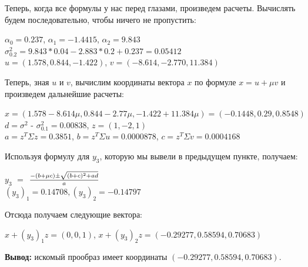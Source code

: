 \documentclass[12pt,a4 paper]{book}
\begin{document}
\begin{enumerate}
Теперь, когда все формулы у нас перед глазами, произведем расчеты. Вычислять будем последовательно, чтобы ничего не пропустить:
\begin{center}
$\alpha_0 = 0.237$, $\alpha_1 = -1.4415$, $\alpha_2 = 9.843$ \\
$\sigma^2_{0.2} = 9.843*0.04-2.883*0.2+0.237 = 0.05412$ \\
$u = (1.578, 0.844, -1.422)$, $v = (-8.614, -2.770, 11.384)$
\end{center}
Теперь, зная $u$ и $v$, вычислим координаты вектора $x$ по формуле $x = u+\mu v$ и произведем дальнейшие расчеты:
\begin{center}
$x = (1.578-8.614\mu,0.844-2.77\mu,-1.422+11.384\mu) = (-0.1448, 0.29, 0.8548)$ \\
\smallskip
$d = \sigma^2 $ - $ \sigma^2_{0.1} = 0.00838$, $z = (1, -2, 1)$\\
\smallskip
$a = z^T\Sigma z = 0.3851$, $b = z^T\Sigma u = 0.0000878$, $c = z^T\Sigma v = 0.0004168$ 
\end{center}
Используя формулу для $y_3$, которую мы вывели в предыдущем пункте, получаем:
\begin{center}
$y_3$ $=$ ${-(b+\mu c)\pm\sqrt{(b+c)^2+ad}}\over{a}$\\
\smallskip
$(y_3)_1 = 0.14708, (y_3)_2 = -0.14797$ \\
\end{center}
Отсюда получаем следующие вектора: 
\begin{center}
$x + (y_3)_1z = (0,0,1)$, $x + (y_3)_2z = (-0.29277, 0.58594, 0.70683)$\\
\end{center}
\textbf{Вывод:} искомый прообраз имеет координаты $(-0.29277, 0.58594, 0.70683)$.
\end{enumerate}

\newpage
\end{document}
